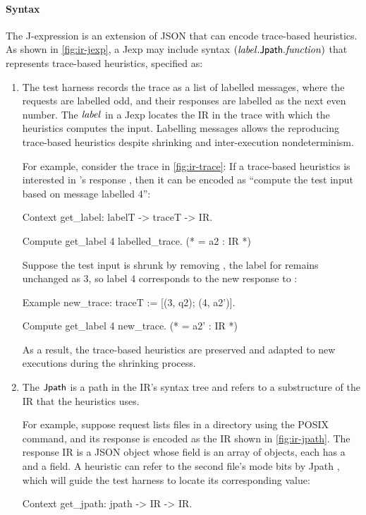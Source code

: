 \paragraph{Syntax}
The J-expression is an extension of JSON that can encode trace-based heuristics.
As shown in \autoref{fig:ir-jexp}, a Jexp may include syntax
$(\mathit{label}.\mathsf{Jpath}.\mathit{function})$ that represents trace-based heuristics, specified as:
\begin{enumerate}
\item The test harness records the trace as a list of labelled messages, where
  the requests are labelled odd, and their responses are labelled as the next
  even number.  The $\mathit{label}$ in a Jexp locates the IR in the trace with which
  the heuristics computes the input.  Labelling messages allows the reproducing
  trace-based heuristics despite shrinking and inter-execution nondeterminism.

  For example, consider the trace in \autoref{fig:ir-trace}: If a trace-based
  heuristics is interested in 's response , then it can be
  encoded as ``compute the test input based on message labelled 4'':
\begin{coq}
  Context get_label: labelT -> traceT -> IR.

  Compute get_label 4 labelled_trace.
  (* = a2 : IR *)
\end{coq}
  
  Suppose the test input is shrunk by removing , the label for 
  remains unchanged as 3, so label 4 corresponds to the new response to
  :
\begin{coq}
  Example new_trace: traceT :=
    [(3, q2); (4, a2')].

  Compute get_label 4 new_trace.
  (* = a2' : IR *)
\end{coq}

As a result, the trace-based heuristics are preserved and adapted to new
executions during the shrinking process.
\item The $\mathsf{Jpath}$ is a path in the IR's syntax tree and refers to a
  substructure of the IR that the heuristics uses.

  For example, suppose request  lists files in a directory using the
  POSIX  command, and its response  is encoded as the IR
  shown in \autoref{fig:ir-jpath}.  The response IR is a JSON object whose
   field is an array of objects, each has a 
  and a  field.  A heuristic can refer to the second file's
  mode bits by Jpath , which will guide the test
  harness to locate its corresponding value:
\begin{coq}
  Context get_jpath: jpath -> IR -> IR.


\end{coq}
\end{enumerate}
